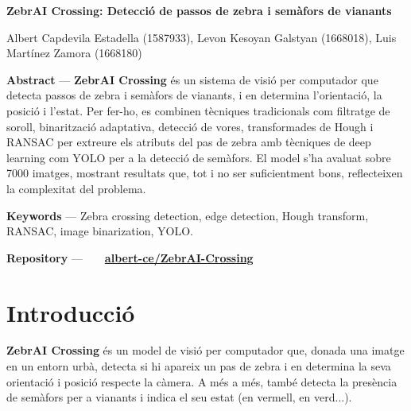 \documentclass[10pt,a4paper,twocolumn,twoside]{article}
\begin{document}
{\sffamily
\noindent\textbf{\LARGE ZebrAI Crossing: Detecció de passos de zebra i semàfors de vianants}
\begin{center}
Albert Capdevila Estadella (1587933), Levon Kesoyan Galstyan (1668018), Luis Martínez Zamora (1668180)
\end{center}

\smallskip

\noindent 
\textbf{Abstract} --- \textbf{ZebrAI Crossing} és un sistema de visió per computador que detecta passos de zebra i semàfors de vianants, i en determina l’orientació, la posició i l’estat. Per fer-ho, es combinen tècniques tradicionals com filtratge de soroll, binarització adaptativa, detecció de vores, transformades de Hough i RANSAC per extreure els atributs del pas de zebra amb tècniques de deep learning com YOLO per a la detecció de semàfors. El model s’ha avaluat sobre 7000 imatges, mostrant resultats que, tot i no ser suficientment bons, reflecteixen la complexitat del problema.

\bigskip

\noindent 
\textbf{Keywords} --- Zebra crossing detection, edge detection, Hough transform, RANSAC, image binarization, YOLO.

\bigskip

\noindent
\textbf{Repository} ---\ \ 
\faGithub\ \  \href{https://github.com/albert-ce/ZebrAI-Crossing}{\small \textbf{albert-ce/ZebrAI-Crossing}}

{\vrule depth 0pt height 0.5pt width 3cm\hspace{7.5pt}%
%
\hspace{7.5pt}\vrule depth 0pt height 0.5pt width 3cm\relax}

}

\section{Introducció}

\textbf{ZebrAI Crossing} és un model de visió per computador que, donada una imatge en un entorn urbà, detecta si hi apareix un pas de zebra i en determina la seva orientació i posició respecte la càmera. A més a més, també detecta la presència de semàfors per a vianants i indica el seu estat (en vermell, en verd...).
\end{document}
